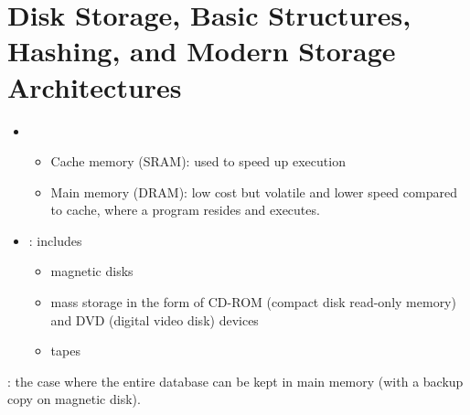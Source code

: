 \chapter{Disk Storage, Basic Structures, Hashing, and Modern Storage
Architectures}


      \begin{itemize}
        \item {}
          \begin{itemize}
            \item Cache memory (SRAM): used to speed up execution
            \item Main memory (DRAM): low cost but volatile and lower speed
              compared to cache, where a program resides and executes.
          \end{itemize}
        \item {}: includes
          \begin{itemize}
            \item magnetic disks
            \item mass storage in the form of CD-ROM (compact disk read-only
              memory) and DVD (digital video disk) devices
            \item tapes
          \end{itemize}
      \end{itemize}
      \par {}: the case where the entire database can be kept in main memory
  (with a backup copy on magnetic disk).

